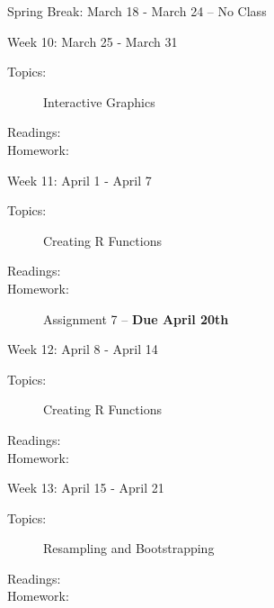 \documentclass[11pt,article,oneside]{memoir}
\newcounter{schedule}
\begin{document}
\begin{schedule}{Spring Break: March 18 - March 24 -- No Class}

\end{schedule}


\begin{schedule}{Week 10: March 25 - March 31}
\begin{description}
\item[Topics:] Interactive Graphics

\item[Readings:] 

\item[Homework:] 

\end{description}
\end{schedule}
\begin{schedule}{Week 11: April 1 - April 7}
\begin{description}
\item[Topics:] Creating R Functions

\item[Readings:] 
\item[Homework:] Assignment 7 -- \textbf{Due April 20th}

\end{description}
\end{schedule}
\begin{schedule}{Week 12: April 8 - April 14}
\begin{description}
\item[Topics:] Creating R Functions

\item[Readings:] 
\item[Homework:] 

\end{description}
\end{schedule}
\begin{schedule}{Week 13: April 15 - April 21}
\begin{description}
\item[Topics:] Resampling and Bootstrapping

\item[Readings:] 

\item[Homework:]

\end{description}
\end{schedule}
\end{document}
